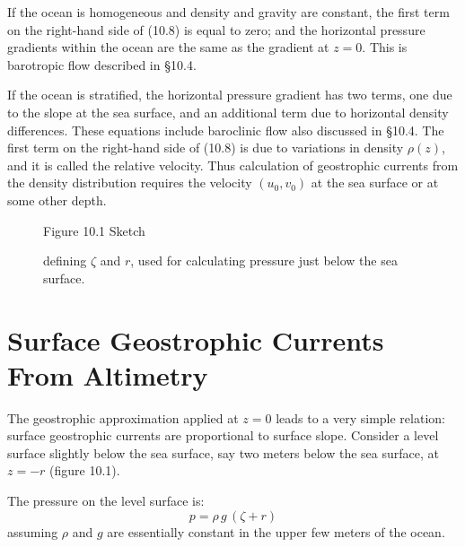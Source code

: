 If the ocean is homogeneous and density and gravity are constant, the
first term on the right-hand side of (10.8) is equal to zero; and the
horizontal pressure gradients within the ocean are the same as the
gradient at $z = 0$. This is barotropic flow described in \S10.4.

If the ocean is stratified, the horizontal pressure gradient has two
terms, one due to the slope at the sea surface, and an additional term
due to horizontal density differences. These equations include
baroclinic flow also discussed in \S10.4. The first term on the
right-hand side of (10.8) is due to variations in density $\rho (z)$,
and it is called the relative velocity. Thus calculation of
geostrophic currents from the density distribution requires the
velocity $\left(u_0, v_0\right)$ at the sea surface or at some other
depth.

\begin{figure}[h!]
\centering
\footnotesize
Figure 10.1 Sketch \rule{0mm}{3ex}defining $\zeta$ and $r$, used for
calculating pressure just below the sea surface.

\label{fig:surfacesketch}
\vspace{-3ex}
\end{figure}

\section{Surface Geostrophic Currents From Altimetry}
The geostrophic approximation applied at $z = 0$ leads
to a very simple relation: surface geostrophic currents are
proportional to surface slope. Consider a level surface slightly below the sea surface, say two meters below the
sea surface, at $z = -r$ (figure 10.1).

The pressure on the level surface is:
\begin{equation}
p = \rho\,g\,\left(\zeta + r\right)
\end{equation}
assuming $\rho$ and $g$ are essentially constant in the upper few
meters of the ocean.

